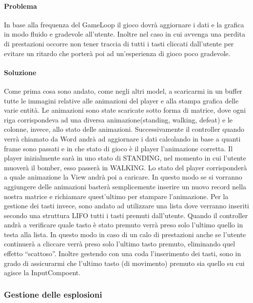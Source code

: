 \documentclass[a4paper,12pt]{report}
\begin{document}
\paragraph{Problema} In base alla frequenza del GameLoop il gioco dovrà aggiornare i dati e la grafica in modo fluido e gradevole all’utente. Inoltre nel caso in cui avvenga una perdita di prestazioni occorre non tener traccia di tutti i tasti cliccati dall’utente per evitare un ritardo che porterà poi ad un'esperienza di gioco poco gradevole.

\paragraph{Soluzione} Come prima cosa sono andato, come negli altri model, a scaricarmi in un buffer tutte le immagini relative alle animazioni del player e alla stampa grafica delle varie entità. Le animazioni sono state scaricate sotto forma di matrice, dove ogni riga corrispondeva ad una diversa animazione(standing, walking, defeat) e le colonne, invece, allo stato delle animazioni. Successivamente il controller quando verrà chiamato da Word andrà ad aggiornare i dati calcolando in base a quanti frame sono passati e in che stato di gioco è il player l'animazione corretta. Il player inizialmente sarà in uno stato di STANDING, nel momento in cui l'utente muoverà il bomber, esso passerà in WALKING. Lo stato del player corrisponderà a quale animazione la View andrà poi a caricare. In questo modo se si vorranno aggiungere delle animazioni basterà  semplicemente inserire un nuovo record nella nostra matrice e richiamare quest'ultimo per stampare l’animazione.  Per la gestione dei tasti invece, sono andato ad utilizzare una lista dove verranno inseriti secondo una struttura LIFO tutti i tasti premuti dall’utente. Quando il controller andrà a verificare quale tasto è stato premuto verrà preso solo l’ultimo quello in testa alla lista. In questo modo in caso di un calo di prestazioni anche se l’utente continuerà a cliccare verrà preso solo l'ultimo tasto premuto, eliminando quel effetto “scattoso”. Inoltre gestendo con una coda l’inserimento dei tasti, sono in grado di assicurarmi che l’ultimo tasto (di movimento) premuto sia quello su cui agisce la InputCompoent.

\subsubsection{Gestione delle esplosioni}
\end{document}
